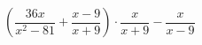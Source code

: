 \begin{ex}[type=expression]
	\begin{condition}
		\(\left( \dfrac{36x}{x^2-81}+\dfrac{x-9}{x+9} \right)\cdot\dfrac{x}{x+9}-\dfrac{x}{x-9}\)
	\end{condition}
\end{ex}